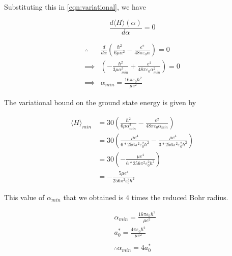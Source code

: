     Substituting this in \ref{eqn:variational}, we have

    \begin{equation*}
        \frac{d\langle H \rangle(\alpha)}{d\alpha} = 0 
    \end{equation*}

    \begin{equation*}
    \begin{split}
        \therefore & \frac{d}{d\alpha} \left( \frac{\hbar^{2}}{6\mu\alpha^2} - \frac{e^2}{48\pi\varepsilon_{0}\alpha} \right) = 0 \\
        \implies & \left( -\frac{\hbar^{2}}{3\mu\alpha_{min}^{3}} + \frac{e^2}{48\pi\varepsilon_{0}\alpha_{min}^{2}}\right) = 0 \\
        \implies & \alpha_{min} = \frac{16\pi\varepsilon_{0}\hbar^{2}}{\mu e^2}
    \end{split}
    \end{equation*}

    The variational bound on the ground state energy is given by

    \begin{equation*}
    \begin{split}
        \langle H \rangle_{min} & = 30 \left( \frac{\hbar^{2}}{6\mu\alpha_{min}^{2}} - \frac{e^2}{48\pi\varepsilon_{0}\alpha_{min}} \right) \\
        & = 30 \left( \frac{\mu e^4}{6*256\pi^{2}\varepsilon_{0}^{2}\hbar^{2}} - \frac{\mu e^4}{3*256\pi^{2}\varepsilon_{0}^{2}\hbar^{2}} \right) \\
        & = 30\left( -\frac{\mu e^4}{6*256\pi^{2}\varepsilon_{0}^{2}\hbar^{2}} \right) \\
        & =  -\frac{5\mu e^4}{256\pi^{2}\varepsilon_{0}^{2}\hbar^{2}}
    \end{split}
    \end{equation*}

    This value of $\alpha_{min}$ that we obtained is 4 times the reduced Bohr
    radius.

    \begin{equation*}
    \begin{split}
        & \alpha_{min} = \frac{16\pi\varepsilon_{0}\hbar^{2}}{\mu e^2} \\
        & a_{0}^{*} = \frac{4\pi\varepsilon_{0}\hbar^{2}}{\mu e^2} \\
    \end{split}
    \end{equation*}
    \begin{equation}
        \therefore \alpha_{min} = 4a_{0}^{*}
    \end{equation}


